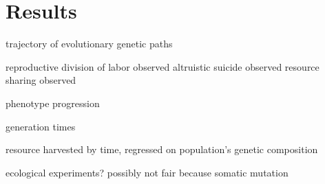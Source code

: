 \section{Results}

trajectory of evolutionary genetic paths

reproductive division of labor observed
altruistic suicide observed
resource sharing observed


phenotype progression

generation times

resource harvested by time,
  regressed on population's genetic composition

ecological experiments?
  possibly not fair because somatic mutation
